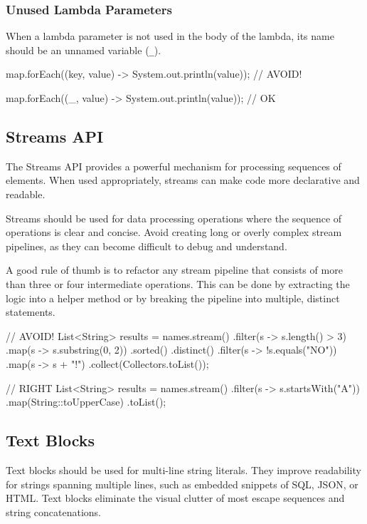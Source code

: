 \documentclass{article}
\begin{document}
\subsubsection{Unused Lambda Parameters}

When a lambda parameter is not used in the body of the lambda, its name should be an unnamed
variable (\texttt{\_}).

\begin{snippet}
map.forEach((key, value) -> System.out.println(value));  // AVOID!

map.forEach((_, value) -> System.out.println(value));    // OK
\end{snippet}

\subsection{Streams API}

The Streams API provides a powerful mechanism for processing sequences of elements. When used
appropriately, streams can make code more declarative and readable.

Streams should be used for data processing operations where the sequence of operations is clear and
concise. Avoid creating long or overly complex stream pipelines, as they can become difficult to
debug and understand.

A good rule of thumb is to refactor any stream pipeline that consists of more than three or four
intermediate operations. This can be done by extracting the logic into a helper method or by
breaking the pipeline into multiple, distinct statements.

\begin{snippet}
// AVOID!
List<String> results = names.stream()
        .filter(s -> s.length() > 3)
        .map(s -> s.substring(0, 2))
        .sorted()
        .distinct()
        .filter(s -> !s.equals("NO"))
        .map(s -> s + "!")
        .collect(Collectors.toList());

// RIGHT
List<String> results = names.stream()
        .filter(s -> s.startsWith("A"))
        .map(String::toUpperCase)
        .toList();
\end{snippet}

\subsection{Text Blocks}

Text blocks should be used for multi-line string literals. They improve readability for strings
spanning multiple lines, such as embedded snippets of SQL, JSON, or HTML. Text blocks eliminate the
visual clutter of most escape sequences and string concatenations.
\end{document}
